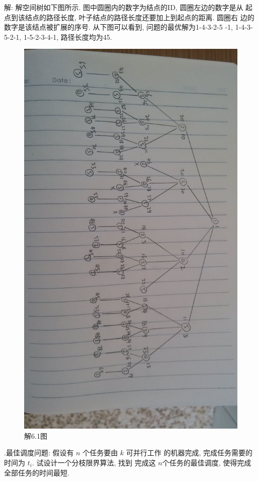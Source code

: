 \documentclass[nofonts, a4paper]{ctexart}
\newcounter{chapt}
\newcounter{subj}
\begin{document}
解: 解空间树如下图所示. 图中圆圈内的数字为结点的ID, 圆圈左边的数字是从
起点到该结点的路径长度, 叶子结点的路径长度还要加上到起点的距离. 圆圈右
边的数字是该结点被扩展的序号. 从下图可以看到, 问题的最优解为1-4-3-2-5%
-1, 1-4-3-5-2-1, 1-5-2-3-4-1, 路径长度均为45.
\begin{figure}
    \includegraphics[scale=0.15]{IMG_20141112_134805.jpg}
    \caption*{解6.1图}
\end{figure}

\thechapt.\thesubj 最佳调度问题: 假设有 $n$ 个任务要由 $k$ 可并行工作
的机器完成, 完成任务需要的时间为 $t_i$. 试设计一个分枝限界算法, 找到
完成这 $n$个任务的最佳调度, 使得完成全部任务的时间最短.
\end{document}

